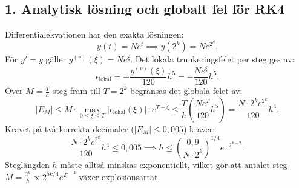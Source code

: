 \documentclass{article}
\begin{document}
\subsection*{1. Analytisk lösning och globalt fel för RK4}
Differentialekvationen har den exakta lösningen:
\begin{equation}
    y(t) = N e^t \implies y(2^k) = N e^{2^k}.
\end{equation}
För $y' = y$ gäller $y^{(v)}(\xi) = N e^\xi$. Det lokala trunkeringsfelet per steg ges av:
\begin{equation}
    \epsilon_{\text{lokal}} = -\frac{y^{(v)}(\xi)}{120} h^5 = -\frac{N e^\xi}{120} h^5.
\end{equation}
Över $M = \frac{T}{h}$ steg fram till $T = 2^k$ begränsas det globala felet av:
\begin{equation}
    |E_M| \le M \cdot \max_{0 \le \xi \le T} |\epsilon_{\text{lokal}}(\xi)| \cdot e^{T - \xi} \le \frac{T}{h} \left(\frac{N e^T}{120} h^5\right) = \frac{N \cdot 2^k e^{2^k}}{120} h^4.
\end{equation}
Kravet på två korrekta decimaler ($|E_M| \le 0{,}005$) kräver:
\begin{equation}
    \frac{N \cdot 2^k e^{2^k}}{120} h^4 \le 0{,}005 \implies h \le \left(\frac{0{,}9}{N \cdot 2^k}\right)^{1/4} e^{-2^{k-2}}.
\end{equation}
Steglängden $h$ måste alltså minskas exponentiellt, vilket gör att antalet steg $M = \frac{2^k}{h} \propto 2^{5k/4} e^{2^{k-2}}$ växer explosionsartat.
\end{document}

